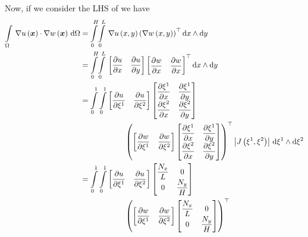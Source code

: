 Now, if we consider the LHS of  we have
\begin{equation}
  \begin{aligned}
    \gint{\Omega}{}{\dotprod{\gradient{}{\fnof{u}{\vectr{x}}}}{\gradient{}{\fnof{w}{\vectr{x}}}}}{\Omega}&=
    \giint{0}{H}{0}{L}{\gradient{}{\fnof{u}{x,y}}\transpose{\pbrac{\gradient{}{\fnof{w}{x,y}}}}}{x}{y}\\
    &=\giint{0}{H}{0}{L}{\begin{bmatrix}\delby{u}{x}&\delby{u}{y}\end{bmatrix}
      \transpose{\begin{bmatrix}\delby{w}{x}&\delby{w}{x}\end{bmatrix}}}{x}{y} \\
    &=\dintl{0}{1}\dintl{0}{1}\begin{bmatrix}\delby{u}{\xione}&\delby{u}{\xitwo}\end{bmatrix}\begin{bmatrix}
      \delby{\xione}{x} & \delby{\xione}{y} \\
      \delby{\xitwo}{x} & \delby{\xitwo}{y}
    \end{bmatrix} \\
    &\qquad\qquad\qquad\transpose{\pbrac{\begin{bmatrix}\delby{w}{\xione}&\delby{w}{\xitwo}\end{bmatrix}\begin{bmatrix}
      \delby{\xione}{x} & \delby{\xione}{y} \\
      \delby{\xitwo}{x} & \delby{\xitwo}{y}
    \end{bmatrix}}}\abs{\fnof{J}{\xione,\xitwo}}\,\exteriorderivop\xione\wedge\exteriorderivop\xitwo \\ 
    &=\dintl{0}{1}\dintl{0}{1}\begin{bmatrix}\delby{u}{\xione}&\delby{u}{\xitwo}\end{bmatrix}\begin{bmatrix}
      \dfrac{N_{x}}{L} & 0 \\
      0 & \dfrac{N_{y}}{H}
    \end{bmatrix} \\
    &\qquad\qquad\qquad\transpose{\pbrac{\begin{bmatrix}\delby{w}{\xione}&\delby{w}{\xitwo}\end{bmatrix}\begin{bmatrix}
      \dfrac{N_{x}}{L} & 0 \\
      0 & \dfrac{N_{y}}{H}

\end{bmatrix}}}
\end{aligned}
\end{equation}

